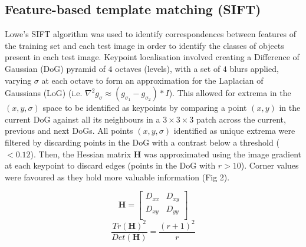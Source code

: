 \documentclass[11pt]{article}
\begin{document}
\begin{multicols}{2}
{\color{indigo}
\section{Feature-based template matching (SIFT)}}
Lowe's SIFT algorithm \cite{lowe1999,lowe2004} was used to identify correspondences between features of the training set and each test image in order to identify the classes of objects present in each test image.  Keypoint localisation involved creating a Difference of Gaussian (DoG) pyramid of $4$ octaves (levels), with a set of $4$ blurs applied, varying $\sigma$ at each octave to form an approximation for the Laplacian of Gaussians (LoG) (i.e. $\nabla^2g_{\sigma} \approx (g_{\sigma_1}-g_{\sigma_2})*I$). This allowed for extrema in the $(x,y,\sigma)$ space to be identified as keypoints by comparing a point $(x,y)$ in the current DoG against all its neighbours in a $3\times3\times3$ patch across the current, previous and next DoGs. All points $(x,y,\sigma)$ identified as unique extrema were filtered by discarding points in the DoG with a contrast below a threshold ($<0.12$). Then, the Hessian matrix $\mathbf{H}$ was approximated using the image gradient at each keypoint to discard edges (points in the DoG with $r>10$). Corner values were favoured as they hold more valuable information (Fig 2). 

\setlength\abovedisplayskip{0pt}
\setlength\belowdisplayskip{0pt}
\setlength\multicolsep{0pt}
\begin{multicols}{2}
\begin{equation*}
\mathbf{H}=\begin{bmatrix}
      D_{xx} & D_{xy} \\
      D_{xy} & D_{yy} \\
     \end{bmatrix}
\end{equation*}\break
\begin{equation*}
\dfrac{Tr(\mathbf{H})^2}{Det(\mathbf{H})}=\dfrac{(r+1)^2}{r}
\end{equation*}
\end{multicols}


\end{multicols}
\end{document}
